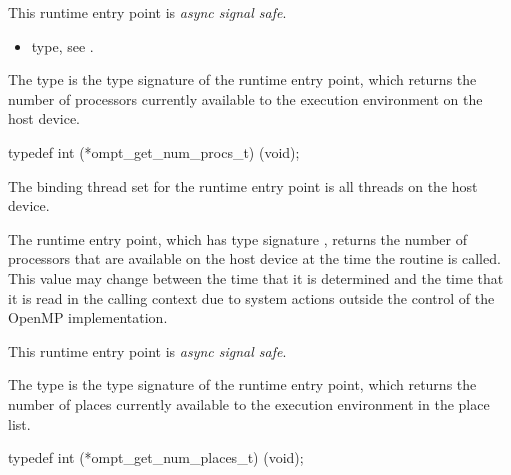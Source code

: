 This runtime entry point is \emph{async signal safe}.

\crossreferences
\begin{itemize}
\item {} type, see .
\end{itemize}



\label{sec:ompt_get_num_procs_t}

\summary
The  type is the type signature of the 
 runtime entry point, which returns the
number of processors currently available to the execution environment 
on the host device.

\format
\begin{ccppspecific}
\begin{omptInquiry}
typedef int (*ompt_get_num_procs_t) (void);
\end{omptInquiry}
\end{ccppspecific}

\binding
The binding thread set for the  runtime entry 
point is all threads on the host device.

\descr
The  runtime entry point, which has type 
signature  , returns the number of processors 
that are available on the host device at the time the routine is called. 
This value may change between the time that it is determined and the 
time that it is read in the calling context due to system actions 
outside the control of the OpenMP implementation.

This runtime entry point is \emph{async signal safe}.



\label{sec:ompt_get_num_places_t}
\label{sec:ompt_get_num_places}

\summary
The  type is the type signature of the 
 runtime entry point, which returns the
number of places currently available to the execution environment 
in the place list.

\format
\begin{ccppspecific}
\begin{omptInquiry}
typedef int (*ompt_get_num_places_t) (void);
\end{omptInquiry}
\end{ccppspecific}

